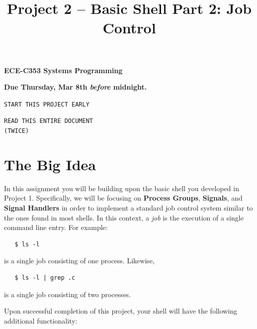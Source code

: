 \documentclass[10pt]{article}
\title{Project 2 -- Basic Shell Part 2: Job Control}
\makeatletter
\def\maketitle{\begin{center}{\bfseries \Large ECE-C353 Systems Programming \\ \@title} \end{center}\vspace{10pt}}
\makeatother
\begin{document}
\maketitle

\vspace{-24pt}

\begin{center}
\vspace{12pt}
\textbf{Due Thursday, Mar 8th \emph{before} midnight.}
\end{center}

\begin{center}
    \texttt{START THIS PROJECT EARLY}

    \texttt{READ THIS ENTIRE DOCUMENT\\(TWICE)}
\end{center}

\section{The Big Idea}

In this assignment you will be building upon the basic shell you
developed in Project 1.  Specifically, we will be focusing on
\textbf{Process Groups}, \textbf{Signals}, and \textbf{Signal Handlers}
in order to implement a standard job control system similar to the ones
found in most shells.  In this context, a \emph{job} is the execution of
a single command line entry.  For example:

\begin{verbatim}
   $ ls -l
\end{verbatim}
is a single job consisting of one process.  Likewise,

\begin{verbatim}
   $ ls -l | grep .c
\end{verbatim}
is a single job consisting of two processes.

\vspace{12pt}

Upon successful completion of this project, your shell will have the
following additional functionality:
\end{document}
